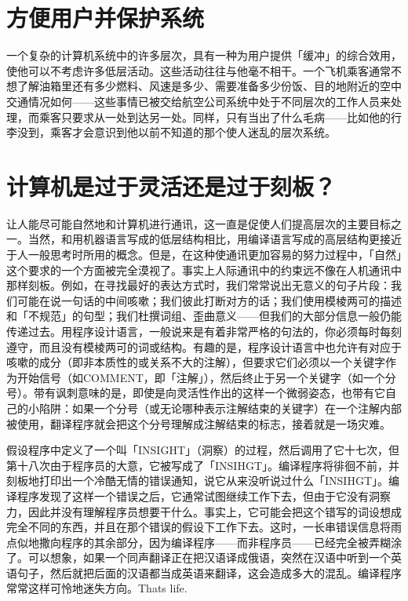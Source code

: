\documentclass[
  12pt,
  twoside,
  openright,
  oldfontcommands,
]{memoir}
\begin{document}
\section{方便用户并保护系统}

一个复杂的计算机系统中的许多层次，具有一种为用户提供「缓冲」的综合效用，使他可以不考虑许多低层活动。这些活动往往与他毫不相干。一个飞机乘客通常不想了解油箱里还有多少燃料、风速是多少、需要准备多少份饭、目的地附近的空中交通情况如何------这些事情已被交给航空公司系统中处于不同层次的工作人员来处理，而乘客只要求从一处到达另一处。同样，只有当出了什么毛病------比如他的行李没到，乘客才会意识到他以前不知道的那个使人迷乱的层次系统。

\section{计算机是过于灵活还是过于刻板？}

让人能尽可能自然地和计算机进行通讯，这一直是促使人们提高层次的主要目标之一。当然，和用机器语言写成的低层结构相比，用编译语言写成的高层结构更接近于人一般思考时所用的概念。但是，在这种使通讯更加容易的努力过程中，「自然」这个要求的一个方面被完全漠视了。事实上人际通讯中的约束远不像在人机通讯中那样刻板。例如，在寻找最好的表达方式时，我们常常说出无意义的句子片段：我们可能在说一句话的中间咳嗽；我们彼此打断对方的话；我们使用模棱两可的描述和「不规范」的句型；我们杜撰词组、歪曲意义------但我们的大部分信息一般仍能传递过去。用程序设计语言，一般说来是有着非常严格的句法的，你必须每时每刻遵守，而且没有模棱两可的词或结构。有趣的是，程序设计语言中也允许有对应于咳嗽的成分（即非本质性的或关系不大的注解），但要求它们必须以一个关键字作为开始信号（如COMMENT，即「注解」），然后终止于另一个关键字（如一个分号）。带有讽刺意味的是，即使是向灵活性作出的这样一个微弱姿态，也带有它自己的小陷阱：如果一个分号（或无论哪种表示注解结束的关键字）在一个注解内部被使用，翻译程序就会把这个分号理解成注解结束的标志，接着就是一场灾难。

假设程序中定义了一个叫「INSIGHT」（洞察）的过程，然后调用了它十七次，但第十八次由于程序员的大意，它被写成了「INSIHGT」。编译程序将徘徊不前，并刻板地打印出一个冷酷无情的错误通知，说它从来没听说过什么「INSIHGT」。编译程序发现了这样一个错误之后，它通常试图继续工作下去，但由于它没有洞察力，因此并没有理解程序员想要干什么。事实上，它可能会把这个错写的词设想成完全不同的东西，并且在那个错误的假设下工作下去。这时，一长串错误信息将雨点似地撒向程序的其余部分，因为编译程序------而非程序员------已经完全被弄糊涂了。可以想象，如果一个同声翻译正在把汉语译成俄语，突然在汉语中听到一个英语句子，然后就把后面的汉语都当成英语来翻译，这会造成多大的混乱。编译程序常常这样可怜地迷失方向。That\textquotesingle s
life.
\end{document}
